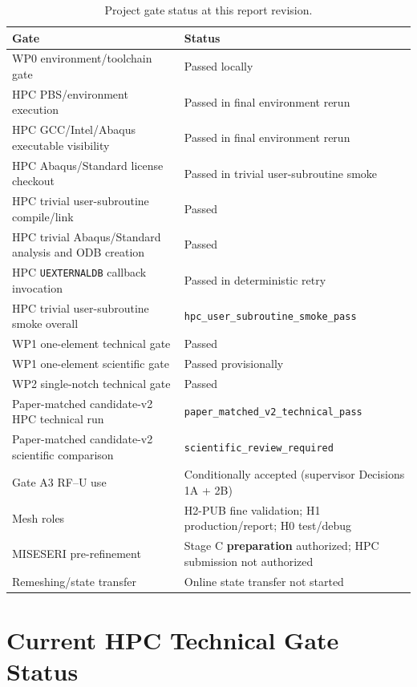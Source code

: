 \documentclass[11pt,a4paper]{article}
\begin{document}
\begin{table}[H]
\centering
\caption{Project gate status at this report revision.}
\begin{tabular}{@{}ll@{}}
\toprule
Gate & Status \\
\midrule
WP0 environment/toolchain gate & Passed locally \\
HPC PBS/environment execution & Passed in final environment rerun \\
HPC GCC/Intel/Abaqus executable visibility & Passed in final environment rerun \\
HPC Abaqus/Standard license checkout & Passed in trivial user-subroutine smoke \\
HPC trivial user-subroutine compile/link & Passed \\
HPC trivial Abaqus/Standard analysis and ODB creation & Passed \\
HPC \texttt{UEXTERNALDB} callback invocation & Passed in deterministic retry \\
HPC trivial user-subroutine smoke overall & \texttt{hpc\_user\_subroutine\_smoke\_pass} \\
WP1 one-element technical gate & Passed \\
WP1 one-element scientific gate & Passed provisionally \\
WP2 single-notch technical gate & Passed \\
Paper-matched candidate-v2 HPC technical run & \texttt{paper\_matched\_v2\_technical\_pass} \\
Paper-matched candidate-v2 scientific comparison & \texttt{scientific\_review\_required} \\
Gate A3 RF--U use & Conditionally accepted (supervisor Decisions 1A + 2B) \\
Mesh roles & H2-PUB fine validation; H1 production/report; H0 test/debug \\
MISESERI pre-refinement & Stage C \textbf{preparation} authorized; HPC submission not authorized \\
Remeshing/state transfer & Online state transfer not started \\
\bottomrule
\end{tabular}
\end{table}

\section{Current HPC Technical Gate Status}
\end{document}
